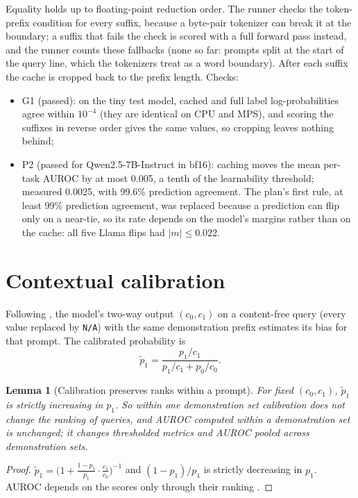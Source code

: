 \documentclass[11pt,a4paper]{article}
\newcommand{\1}{\mathbf{1}}
\theoremstyle{plain}
\newtheorem{lemma}[theorem]{Lemma}
\theoremstyle{definition}
\theoremstyle{remark}
\newcommand{\status}[1]{\par\noindent\hfill\fcolorbox{black!35}{black!4}{\scriptsize\sffamily Status: #1}\par\medskip}
\begin{document}
Equality holds up to floating-point reduction order. The runner checks the
token-prefix condition for every suffix, because a byte-pair tokenizer
\citep{sennrich2016neural} can break it at the boundary; a suffix that fails
the check is scored with a full forward pass instead, and the runner counts
these fallbacks (none so far: prompts split at the start of the query line,
which the tokenizers treat as a word boundary). After each suffix the cache
is cropped back to the prefix length. Checks:
\begin{itemize}[nosep]
  \item G1 (passed): on the tiny test model, cached and full label
        log-probabilities agree within $10^{-4}$ (they are identical on CPU
        and MPS), and scoring the suffixes in reverse order gives the same
        values, so cropping leaves nothing behind;
  \item P2 (passed for Qwen2.5-7B-Instruct in bf16): caching moves the mean
        per-task AUROC by at most 0.005, a tenth of the learnability
        threshold; measured 0.0025, with 99.6\% prediction agreement. The
        plan's first rule, at least 99\% prediction agreement, was replaced
        because a prediction can flip only on a near-tie, so its rate
        depends on the model's margins rather than on the cache: all five
        Llama flips had $|m| \leq 0.022$.
\end{itemize}

\section{Contextual calibration}
\label{sec:calibration}
\status{Implemented (P1)}

Following \citet{zhao2021calibrate}, the model's two-way output
$(c_0, c_1)$ on a content-free query (every value replaced by
\texttt{N/A}) with the same demonstration prefix estimates its bias for that
prompt. The calibrated probability is
\[
  \tilde p_1 = \frac{p_1 / c_1}{p_1/c_1 + p_0/c_0}.
\]

\begin{lemma}[Calibration preserves ranks within a prompt]
\label{lem:calibration}
For fixed $(c_0, c_1)$, $\tilde p_1$ is strictly increasing in $p_1$. So
within one demonstration set calibration does not change the ranking of
queries, and AUROC computed within a demonstration set is unchanged; it
changes thresholded metrics and AUROC pooled across demonstration sets.
\end{lemma}
\begin{proof}
$\tilde p_1 = \big(1 + \tfrac{1-p_1}{p_1}\cdot\tfrac{c_1}{c_0}\big)^{-1}$
and $(1-p_1)/p_1$ is strictly decreasing in $p_1$. AUROC depends on the
scores only through their ranking \citep{fawcett2006introduction}.
\end{proof}
\end{document}
